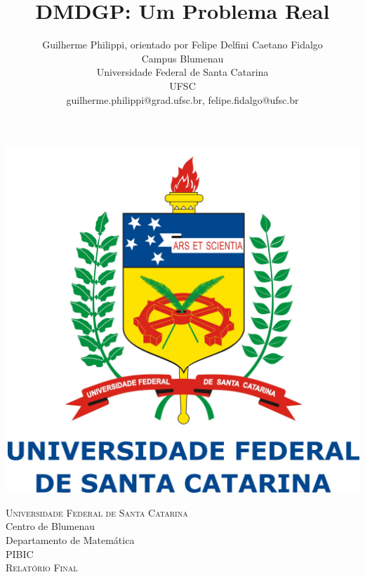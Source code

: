 \documentclass[a4paper,12pt]{article}
\title{DMDGP: Um Problema Real}
\author{Guilherme Philippi\Mark{*}, orientado por Felipe Delfini Caetano Fidalgo\Mark{\dagger}\\Campus Blumenau\\Universidade Federal de Santa Catarina\\UFSC
\\guilherme.philippi@grad.ufsc.br\Mark{*}, felipe.fidalgo@ufsc.br\Mark{\dagger}}
\begin{document}
	\begin{titlepage}
		\newcommand{\HRule}{\rule{\linewidth}{0.5mm}} %
		\center %
		\begin{center}
			\includegraphics[scale=0.22]{logoufsc.jpg}
		\end{center}
		\vspace{1cm}
		
		\textsc{\LARGE \hspace{-0.17cm}Universidade Federal de Santa Catarina}\\[0.5cm] %
		{\Large Centro de Blumenau \\ Departamento de Matemática}\\[1.5cm] %
		\textsc{\Large PIBIC \\ Relatório Final \vspace{1.5cm} }\\[2.0cm] %
		
		

\end{titlepage}
\end{document}
